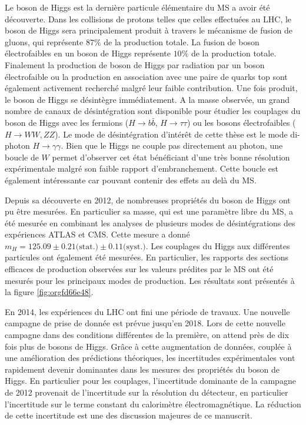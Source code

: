 Le boson de Higgs est la dernière particule élémentaire du MS a avoir été découverte.
Dans les collisions de protons telles que celles effectuées au LHC, le boson de Higgs sera principalement produit à travers le mécanisme de fusion de gluons, qui représente $87\%$ de la production totale.
La fusion de boson électrofaibles en un boson de Higgs représente $10\%$ de la production totale.
Finalement la production de boson de Higgs par radiation par un boson électrofaible ou la production en association avec une paire de quarks top sont également activement recherché malgré leur faible contribution.
Une fois produit, le boson de Higgs se désintègre immédiatement.
A la masse observée, un grand nombre de canaux de désintégration sont disponible pour étudier les couplages du boson de Higgs avec les fermions ($H\rightarrow b\bar{b}$, $H\rightarrow \tau\tau$) ou les bosons électrofaibles ($H\rightarrow WW, ZZ$).
Le mode de désintégration d'intérêt de cette thèse est le mode di-photon $H\rightarrow \gamma\gamma$.
Bien que le Higgs ne couple pas directement au photon, une boucle de $W$ permet d'observer cet état bénéficiant d'une très bonne résolution expérimentale malgré son faible rapport d'embranchement.
Cette boucle est également intéressante car pouvant contenir des effets au delà du MS.

Depuis sa découverte en 2012, de nombreuses propriétés du boson de Higgs ont pu être mesurées.
En particulier sa masse, qui est une paramètre libre du MS, a été mesurée en combinant les analyses de plusieurs modes de désintégrations des expériences ATLAS et CMS.
Cette mesure a donné $m_H = 125.09 \pm 0.21 \text{(stat.)} \pm 0.11 \text{(syst.)}$.
Les couplages du Higgs aux différentes particules ont également été mesurées.
En particulier, les rapports des sections efficaces de production observées sur les valeurs prédites par le MS ont été mesurés pour les principaux modes de production.
Les résultats sont présentés à la figure \ref{fig:orgfd66e48}.

En 2014, les expériences du LHC ont fini une période de travaux.
Une nouvelle campagne de prise de donnée est prévue jusqu'en 2018.
Lors de cette nouvelle campagne dans des conditions différentes de la première, on attend près de dix fois plus de bosons de Higgs.
Grâce à cette augmentation de données, couplée à une amélioration des prédictions théoriques, les incertitudes expérimentales vont rapidement devenir dominantes dans les mesures des propriétés du boson de Higgs.
En particulier pour les couplages, l'incertitude dominante de la campagne de 2012 provenait de l'incertitude sur la résolution du détecteur, en particulier l'incertitude sur le terme constant du calorimètre électromagnétique.
La réduction de cette incertitude est une des discussion majeures de ce manuscrit.

